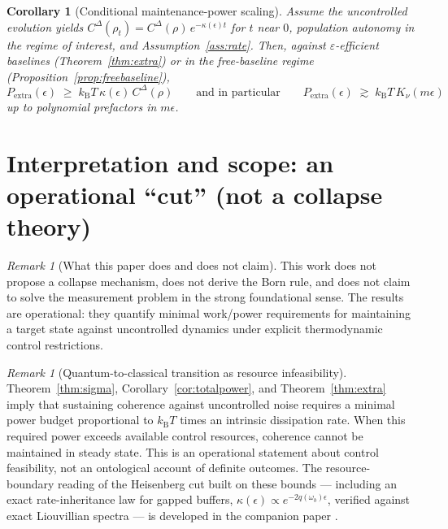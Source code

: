 \documentclass[11pt,a4paper]{article}
\theoremstyle{plain}
\newtheorem{corollary}[theorem]{Corollary}
\theoremstyle{definition}
\theoremstyle{remark}
\newtheorem{remark}[theorem]{Remark}
\newcommand{\kB}{k_{\mathrm{B}}}
\newcommand{\Pextra}{P_{\mathrm{extra}}}
\begin{document}
\begin{corollary}[Conditional maintenance-power scaling]\label{cor:maintscale}
Assume the uncontrolled evolution yields
$C^\Delta(\rho_t) = C^\Delta(\rho)\,e^{-\kappa(\epsilon)t}$ for $t$ near $0$,
population autonomy in the regime of interest, and
Assumption~\ref{ass:rate}. Then, against $\varepsilon$-efficient baselines
(Theorem~\ref{thm:extra}) or in the free-baseline regime
(Proposition~\ref{prop:freebaseline}),
\begin{equation}
\Pextra(\epsilon) \;\ge\; \kB T\, \kappa(\epsilon)\, C^\Delta(\rho)
\qquad\text{and in particular}\qquad
\Pextra(\epsilon) \;\gtrsim\; \kB T\, K_\nu(m\epsilon)
\end{equation}
up to polynomial prefactors in $m\epsilon$.
\end{corollary}

\section{Interpretation and scope: an operational ``cut'' (not a collapse
theory)}

\begin{remark}[What this paper does and does not claim]
This work does not propose a collapse mechanism, does not derive the Born rule,
and does not claim to solve the measurement problem in the strong foundational
sense. The results are operational: they quantify minimal work/power
requirements for maintaining a target state against uncontrolled dynamics under
explicit thermodynamic control restrictions.
\end{remark}

\begin{remark}[Quantum-to-classical transition as resource infeasibility]
Theorem~\ref{thm:sigma}, Corollary~\ref{cor:totalpower}, and
Theorem~\ref{thm:extra} imply that sustaining coherence against uncontrolled
noise requires a minimal power budget proportional to $\kB T$ times an
intrinsic dissipation rate. When this required power exceeds available control
resources, coherence cannot be maintained in steady state. This is an
operational statement about control feasibility, not an ontological account of
definite outcomes. The resource-boundary reading of the Heisenberg cut built on
these bounds --- including an exact rate-inheritance law for gapped buffers,
$\kappa(\epsilon) \propto e^{-2q(\omega_b)\epsilon}$, verified against exact
Liouvillian spectra --- is developed in the companion paper \cite{HCut}.
\end{remark}
\end{document}

